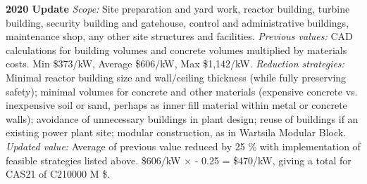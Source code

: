  \textbf{2020 Update} 
\emph{Scope: } 
Site preparation and yard work, reactor building, turbine building, security building and gatehouse, control and administrative buildings, maintenance shop, any other site structures and facilities. 
 \emph{Previous values:} CAD calculations for building volumes and concrete volumes multiplied by materials costs. 
Min \$373/kW, Average \$606/kW, Max \$1,142/kW. 
\emph{Reduction strategies: } 
Minimal reactor building size and wall/ceiling thickness (while fully preserving safety); minimal volumes for concrete and other materials (expensive concrete vs. inexpensive soil or sand, perhaps as inner fill material within metal or concrete walls); avoidance of unnecessary buildings in plant design; reuse of buildings if an existing power plant site; modular construction, as in Wartsila Modular Block. 
\emph{Updated value: } 
Average of previous value reduced by 25 \% with implementation of feasible strategies listed above. \$606/kW $\times$ - 0.25 = \$470/kW, giving a total for CAS21 of C210000 M \$. 

